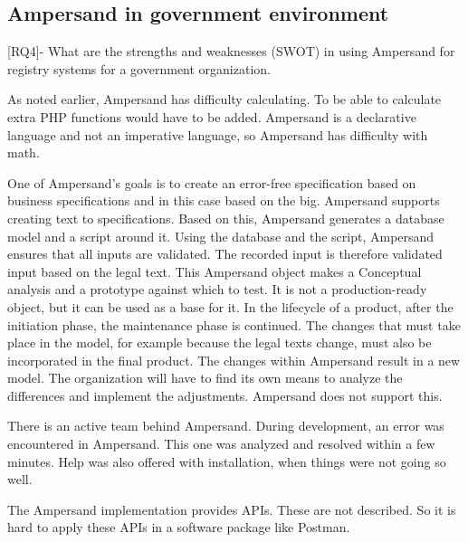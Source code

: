 \def\rq{RQ4}

\subsection{Ampersand in government environment}
[RQ4]- What are the strengths and weaknesses (SWOT) in using Ampersand for registry systems for a government organization.


As noted earlier, Ampersand has difficulty calculating.
To be able to calculate extra PHP functions would have to be added.
Ampersand is a declarative language and not an imperative language, so Ampersand has difficulty with math.


One of Ampersand's goals is to create an error-free specification based on business specifications and in this case based on the \acrshort{big}.
Ampersand supports creating text to specifications.
Based on this, Ampersand generates a database model and a script around it.
Using the database and the script, Ampersand ensures that all inputs are validated.
The recorded input is therefore validated input based on the legal text.
This Ampersand object makes a Conceptual analysis and a prototype against which to test.
It is not a production-ready object, but it can be used as a base for it.
In the lifecycle of a product, after the initiation phase, the maintenance phase is continued.
The changes that must take place in the model, for example because the legal texts change, must also be incorporated in the final product.
The changes within Ampersand result in a new model.
The organization will have to find its own means to analyze the differences and implement the adjustments.
Ampersand does not support this.

There is an active team behind Ampersand.
During development, an error was encountered in Ampersand.
This one was analyzed and resolved within a few minutes.
Help was also offered with installation, when things were not going so well.

The Ampersand implementation provides APIs.
These are not described.
So it is hard to apply these APIs in a software package like Postman.

